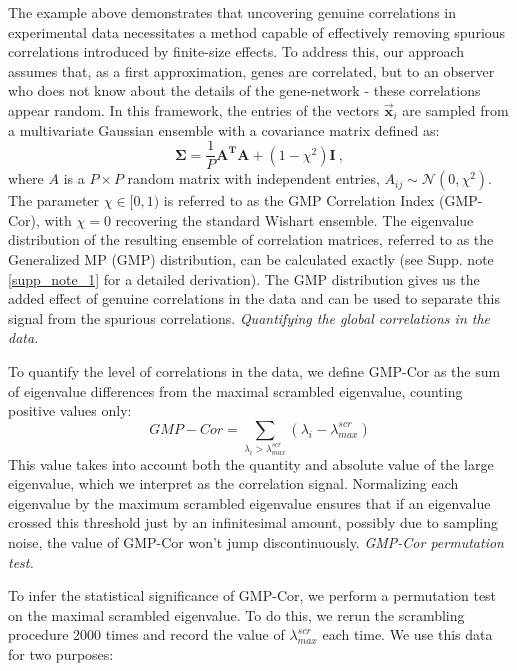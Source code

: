\documentclass[12pt]{article}
\begin{document}
The example above demonstrates that uncovering genuine correlations in experimental data necessitates a method capable of effectively removing spurious correlations introduced by finite-size effects. To address this, our approach assumes that, as a first approximation, genes are correlated, but to an observer who does not know about the details of the gene-network - these correlations appear random. In this framework, the entries of the vectors $\vec{\mathbf{x}}_i$ are sampled from a multivariate Gaussian ensemble with a covariance matrix defined as:
\begin{equation}\label{population_covariance}
    \mathbf{\Sigma}=\frac{1}{P}\mathbf{A^T{A}}+(1-\chi^2)\mathbf{I} \ ,
\end{equation}
where $A$ is a $P\times{P}$ random matrix with independent entries, $A_{ij}\sim\mathcal{N}(0,\chi^2)$. The parameter $\chi\in[0,1)$ is referred to as the GMP Correlation Index (GMP-Cor), with $\chi=0$ recovering the standard Wishart ensemble. The eigenvalue distribution of the resulting ensemble of correlation matrices, referred to as the Generalized MP (GMP) distribution, can be calculated exactly (see Supp. note \ref{supp_note_1} for a detailed derivation). The GMP distribution gives us the added effect of genuine correlations in the data and can be used to separate this signal from the spurious correlations.
\vspace{0.5cm}
\newline
\textit{Quantifying the global correlations in the data.}\par
To quantify the level of correlations in the data, we define GMP-Cor as the sum of eigenvalue differences from the maximal scrambled eigenvalue, counting positive values only:
\begin{equation}
    GMP-Cor = \sum_{\lambda_i>\lambda_{max}^{scr}}{(\lambda_i - \lambda_{max}^{scr})}
\end{equation}
This value takes into account both the quantity and absolute value of the large eigenvalue, which we interpret as the correlation signal. Normalizing each eigenvalue by the maximum scrambled eigenvalue ensures that if an eigenvalue crossed this threshold just by an infinitesimal amount, possibly due to sampling noise, the value of GMP-Cor won't jump discontinuously. 
\vspace{0.5cm}
\newline
\textit{GMP-Cor permutation test.}\par
To infer the statistical significance of GMP-Cor, we perform a permutation test on the maximal scrambled eigenvalue. To do this, we rerun the scrambling procedure 2000 times and record the value of $\lambda_{max}^{scr}$ each time. We use this data for two purposes:
\end{document}
